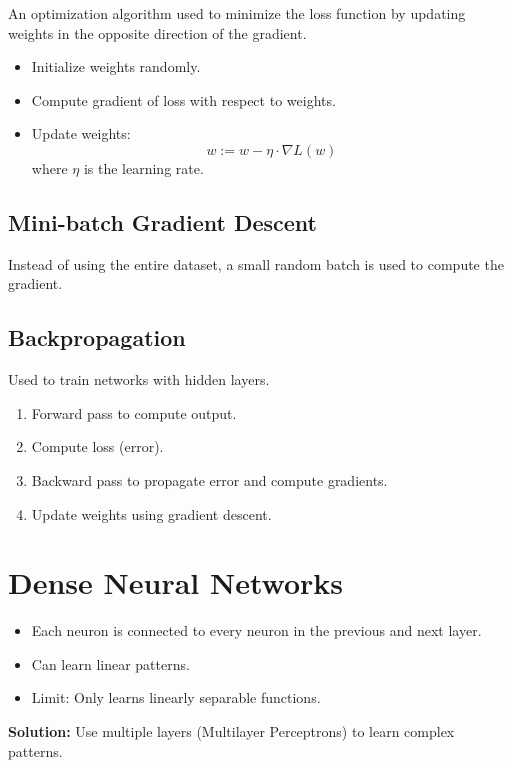 An optimization algorithm used to minimize the loss function by updating weights in the opposite direction of the gradient.

\begin{itemize}
    \item Initialize weights randomly.
    \item Compute gradient of loss with respect to weights.
    \item Update weights:
    \[
    w := w - \eta \cdot \nabla L(w)
    \]
    where $\eta$ is the learning rate.
\end{itemize}

\subsection*{Mini-batch Gradient Descent}

Instead of using the entire dataset, a small random batch is used to compute the gradient.

\subsection*{Backpropagation}

Used to train networks with hidden layers.

\begin{enumerate}
    \item Forward pass to compute output.
    \item Compute loss (error).
    \item Backward pass to propagate error and compute gradients.
    \item Update weights using gradient descent.
\end{enumerate}

\section{Dense Neural Networks}

\begin{itemize}
    \item Each neuron is connected to every neuron in the previous and next layer.
    \item Can learn linear patterns.
    \item Limit: Only learns linearly separable functions.
\end{itemize}

\textbf{Solution:} Use multiple layers (Multilayer Perceptrons) to learn complex patterns.

